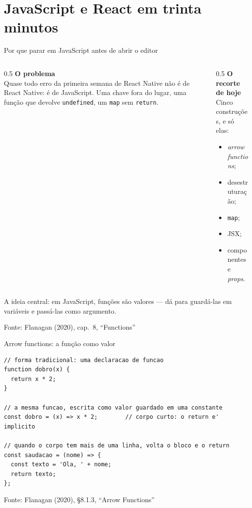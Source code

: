 \documentclass[aspectratio=169]{beamer}
\newcommand{\fonte}[1]{\vfill\hfill{\scriptsize\textcolor{UFSGray}{Fonte: #1}}}
\begin{document}
\section{JavaScript e React em trinta minutos}

\begin{frame}{Por que parar em JavaScript antes de abrir o editor}
  \begin{columns}[T]
    \begin{column}{0.5\textwidth}
      \textbf{O problema}\\[0.3em]
      Quase todo erro da primeira semana de React Native não é de React
      Native: é de JavaScript. Uma chave fora do lugar, uma função que
      devolve \texttt{undefined}, um \texttt{map} sem \texttt{return}.
    \end{column}
    \begin{column}{0.5\textwidth}
      \textbf{O recorte de hoje}\\[0.3em]
      Cinco construções, e só elas:
      \begin{itemize}
        \item \emph{arrow functions};
        \item desestruturação;
        \item \texttt{map};
        \item JSX;
        \item componentes e \emph{props}.
      \end{itemize}
    \end{column}
  \end{columns}
  \begin{block}{}
    A ideia central: em JavaScript, funções são valores ---
    dá para guardá-las em variáveis e passá-las como argumento.
  \end{block}
  \fonte{Flanagan (2020), cap.\ 8, ``Functions''~\cite{flanagan2020javascript}}
\end{frame}

\begin{frame}[fragile]{Arrow functions: a função como valor}
\begin{lstlisting}[style=js]
// forma tradicional: uma declaracao de funcao
function dobro(x) {
  return x * 2;
}

// a mesma funcao, escrita como valor guardado em uma constante
const dobro = (x) => x * 2;        // corpo curto: o return e' implicito

// quando o corpo tem mais de uma linha, volta o bloco e o return
const saudacao = (nome) => {
  const texto = 'Ola, ' + nome;
  return texto;
};
\end{lstlisting}
  \fonte{Flanagan (2020), \S 8.1.3, ``Arrow Functions''~\cite{flanagan2020javascript}}
\end{frame}
\end{document}
